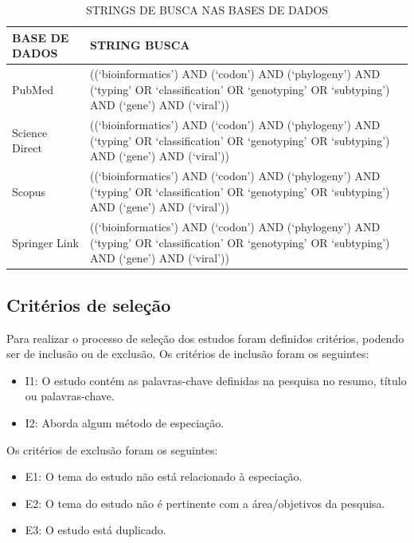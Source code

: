 \documentclass[12pt]{article}
\begin{document}
\begin{table}[h]
    \centering

    \caption{STRINGS DE BUSCA NAS BASES DE DADOS}
    \label{tab:stringBuscaBase}
    \begin{tabular}{|p{2cm}|p{10cm}|}
        \hline
        BASE DE DADOS  & STRING BUSCA

        \\
        \hline
        PubMed         & ((`bioinformatics') AND (`codon') AND (`phylogeny') AND (`typing' OR `classification' OR `genotyping' OR `subtyping') AND (`gene') AND (`viral'))
        \\
        \hline
        Science Direct & ((`bioinformatics') AND (`codon') AND (`phylogeny') AND (`typing' OR `classification' OR `genotyping' OR `subtyping') AND (`gene') AND (`viral')) \\
        \hline
        Scopus         & ((`bioinformatics') AND (`codon') AND (`phylogeny') AND (`typing' OR `classification' OR `genotyping' OR `subtyping') AND (`gene') AND (`viral'))
        \\
        \hline
        Springer Link  & ((`bioinformatics') AND (`codon') AND (`phylogeny') AND (`typing' OR `classification' OR `genotyping' OR `subtyping') AND (`gene') AND (`viral'))
        \\
        \hline
    \end{tabular}

\end{table}

\subsection{Critérios de seleção}

Para realizar o processo de seleção dos estudos foram definidos critérios, podendo ser de inclusão ou de exclusão.
Os critérios de inclusão foram os seguintes:

\begin{itemize}
    \item I1: O estudo contém as palavras-chave definidas na pesquisa no resumo, título ou palavras-chave.
    \item I2: Aborda algum método de especiação.
\end{itemize}
Os critérios de exclusão foram os seguintes:
\begin{itemize}
    \item E1: O tema do estudo não está relacionado à especiação.
    \item E2: O tema do estudo não é pertinente com a área/objetivos da pesquisa.
    \item E3: O estudo está duplicado.
\end{itemize}
\end{document}
